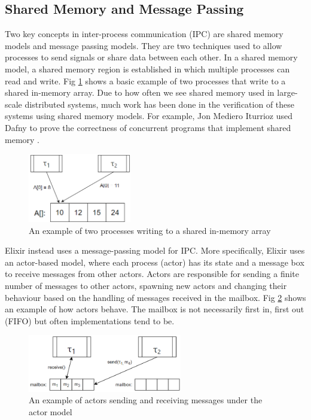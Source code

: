 \subsection[]{Shared Memory and Message Passing}
Two key concepts in inter-process communication (IPC) are shared memory models and message passing models. They are two techniques used to allow processes to send signals or share data between each other. In a shared memory model, a shared memory region is established in which multiple processes can read and write. Fig \ref{fig:shared_memory} shows a basic example of two processes that write to a shared in-memory array. Due to how often we see shared memory used in large-scale distributed systems, much work has been done in the verification of these systems using shared memory models. For example, Jon Mediero Iturrioz used Dafny \cite{dafny} to prove the correctness of concurrent programs that implement shared memory \cite{shared_memory_verification}. 
\begin{figure}[h]
    \centering
    \includegraphics[width=0.4\textwidth]{images/shared_memory.png}
    \caption{An example of two processes writing to a shared in-memory array}
    \label{fig:shared_memory}
\end{figure}
\par
Elixir instead uses a message-passing model for IPC. More specifically, Elixir uses an actor-based model, where each process (actor) has its state and a message box to receive messages from other actors. Actors are responsible for sending a finite number of messages to other actors, spawning new actors and changing their behaviour based on the handling of messages received in the mailbox. Fig \ref{fig:actor_model} shows an example of how actors behave. The mailbox is not necessarily first in, first out (FIFO) but often implementations tend to be.
\begin{figure}[h]
    \centering
    \includegraphics[width=0.6\textwidth]{images/actor_model.png}
    \caption{An example of actors sending and receiving messages under the actor model}
    \label{fig:actor_model}
\end{figure}
